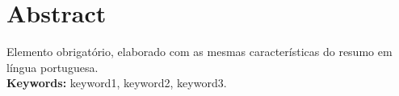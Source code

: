 \documentclass[11pt,twoside,a4paper]{book}
\begin{document}



\chapter*{Abstract}

Elemento obrigatório, elaborado com as mesmas características do resumo em
língua portuguesa.
\\

\noindent \textbf{Keywords:} keyword1, keyword2, keyword3.


\tableofcontents    %




\end{document}
